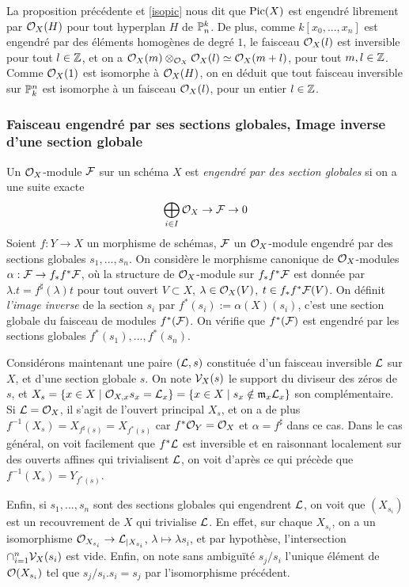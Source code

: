 La proposition précédente et \ref{isopic} nous dit que $\operatorname{Pic}(X)$ est engendré librement par $\mathcal{O}_X(H)$ pour tout hyperplan $H$ de $\mathbb{P}_n^k$. De plus, comme $k[x_0,...,x_n]$ est engendré par des éléments homogènes de degré $1$, le faisceau $\mathcal{O}_X(l)$ est inversible pour tout $l\in \mathbb{Z}$, et on a $\mathcal{O}_X(m)\otimes_{\mathcal{O}_X}\mathcal{O}_X(l)\simeq \mathcal{O}_X(m+l)$, pour tout $m,l\in \mathbb{Z}$. Comme $\mathcal{O}_X(1)$ est isomorphe à $\mathcal{O}_X(H)$, on en déduit que tout faisceau inversible sur $\mathbb{P}_k^n$ est isomorphe à un faisceau $\mathcal{O}_X(l)$, pour un entier $l\in \mathbb{Z}$.

\subsubsection{Faisceau engendré par ses sections globales, Image inverse d'une section globale}
\noindent Un $\mathcal{O}_X$-module $\mathcal{F}$ sur un schéma $X$ est \textit{engendré par des section globales} si on a une suite exacte 
$$\bigoplus_{i\in I}\mathcal{O}_X\rightarrow \mathcal{F}\rightarrow 0$$
Soient $f:Y\rightarrow X$ un morphisme de schémas, $\mathcal{F}$ un $\mathcal{O}_X$-module engendré par des sections globales $s_1,...,s_n$. On considère le morphisme canonique de $\mathcal{O}_X$-modules $\alpha:\mathcal{F}\rightarrow f_*f^*\mathcal{F}$, où la structure de $\mathcal{O}_X$-module sur $f_*f^*\mathcal{F}$ est donnée par $\lambda.t=f^\sharp(\lambda)t$ pour tout ouvert $V\subset X$, $\lambda\in \mathcal{O}_X(V)$, $t\in f_*f^*\mathcal{F}(V)$. On définit \textit{l'image inverse} de la section $s_i$ par $f^*(s_i):=\alpha(X)(s_i)$, c'est une section globale du faisceau de modules $f^*(\mathcal{F})$. On vérifie que $f^*(\mathcal{F})$ est engendré par les sections globales $f^*(s_1),...,f^*(s_n)$.

Considérons maintenant une paire $(\mathcal{L},s)$ constituée d'un faisceau inversible $\mathcal{L}$ sur $X$, et d'une section globale $s$. On note $\mathcal{V}_X(s)$ le support du diviseur des zéros de $s$, et $X_{s}=\lbrace x\in X\mid \mathcal{O}_{X,x}s_x=\mathcal{L}_x\rbrace=\lbrace x\in X\mid s_x\notin \mathfrak{m}_x\mathcal{L}_x\rbrace$ son complémentaire. Si $\mathcal{L}=\mathcal{O}_X$, il s'agit de l'ouvert principal $X_s$, et on a de plus $f^{-1}(X_s)=X_{f^\sharp(s)}=X_{f^*(s)}$ car $f^*\mathcal{O}_Y=\mathcal{O}_X$ et $\alpha=f^\sharp$ dans ce cas. Dans le cas général, on voit facilement que $f^*\mathcal{L}$ est inversible et en raisonnant localement sur des ouverts affines qui trivialisent $\mathcal{L}$, on voit d'après ce qui précède que $f^{-1}(X_s)=Y_{f^*(s)}$.  

Enfin, si $s_1,...,s_n$ sont des sections globales qui engendrent $\mathcal{L}$, on voit que $(X_{s_i})$ est un recouvrement de $X$ qui trivialise $\mathcal{L}$. En effet, sur chaque $X_{s_i}$, on a un isomorphisme $\mathcal{O}_{X_{s_i}}\rightarrow \mathcal{L}_{|X_{s_i}}$, $\lambda \mapsto \lambda s_i$, et par hypothèse, l'intersection $\cap_{i=1}^n \mathcal{V}_X(s_i)$ est vide. Enfin, on note sans ambiguïté $s_j/s_i$ l'unique élément de $\mathcal{O}(X_{s_i})$ tel que $s_j/s_i.s_i=s_j$ par l'isomorphisme précédent.

